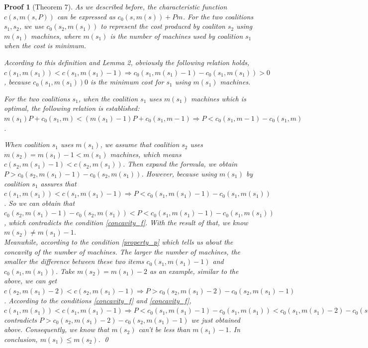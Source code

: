 \documentclass[UTF8]{article}
\newtheorem{pf}{\hspace{2em}Proof}
\begin{document}
\begin{pf}[Theorem 7]

As we described before, the characteristic function $c(s,m(s,P))$ can be expressed as $c_0(s,m(s))+Pm$. For the two coalitions $s_1, s_2$, we use $c_0(s_2,m(s_1))$ to represent the cost produced by coaliton $s_2$ using $m(s_1)$ machines, where $m(s_1)$ is the number of machines used by coalition $s_1$ when the cost is minimum.

According to this definition and Lemma 2, obviously the following relation holds,
$c(s_1,m(s_1)) < c(s_1,m(s_1)-1) \Rightarrow c_0(s_1,m(s_1)-1)-c_0(s_1,m(s_1))>0$, because $c_0(s_1,m(s_1))0$ is the minimum cost for $s_1$ using $m(s_1)$ machines.

For the two coalitions $s_1$, when the coalition $s_1$ uses $m(s_1)$ machines which is optimal, the following relation is established:
$m(s_1)P+c_0(s_1,m) < (m(s_1)-1)P+c_0(s_1,m-1) \Rightarrow P < c_0(s_1,m-1) - c_0(s_1,m)$.

When coalition $s_1$ uses $m(s_1)$, we assume that coalition $s_2$ uses $m(s_2)=m(s_1)-1<m(s_1)$ machines, which means $c(s_2,m(s_1)-1) < c(s_2,m(s_1))$. Then expand the formula, we obtain $P > c_0(s_2,m(s_1)-1)- c_0(s_2,m(s_1))$. However, because using $m(s_1)$ by coalition $s_1$ assures that $c(s_1,m(s_1)) < c(s_1,m(s_1)-1) \Rightarrow P < c_0(s_1,m(s_1)-1)-c_0(s_1,m(s_1))$.
So we can obtain that $ c_0(s_2,m(s_1)-1)- c_0(s_2,m(s_1)) <P <c_0(s_1,m(s_1)-1)-c_0(s_1,m(s_1))$, which contradicts the condition \ref{concavity_f}.
With the result of that, we know $m(s_2) \neq m(s_1)-1$. \\
Meanwhile, according to the condition \ref{property_p} which tells us about the concavity of the number of machines. The larger the number of machines, the smaller the difference between these two items $c_0(s_1,m(s_1)-1)$ and $c_0(s_1,m(s_1))$. Take $m(s_2) = m(s_1)-2$ as an example, similar to the above, we can get $c(s_2,m(s_1)-2) < c(s_2,m(s_1)-1) \Rightarrow P > c_0(s_2,m(s_1)-2) - c_0(s_2,m(s_1)-1)$. According to the conditions \ref{concavity_f} and \ref{concavity_f},
$c(s_1,m(s_1)) < c(s_1,m(s_1)-1) \Rightarrow P < c_0(s_1,m(s_1)-1)-c_0(s_1,m(s_1)) < c_0(s_1,m(s_1)-2)-c_0(s_1,m(s_1)-1) < c_0(s_2,m(s_1)-2) - c_0(s_2,m(s_1)-1)$ contradicts
$P > c_0(s_2,m(s_1)-2) - c_0(s_2,m(s_1)-1)$ we just obtained above.
Consequently, we know that $m(s_2)$ can't be less than $m(s_1)-1$.
In conclusion, $m(s_1) \leq m(s_2)$.
\qed
\end{pf}
\end{document}
